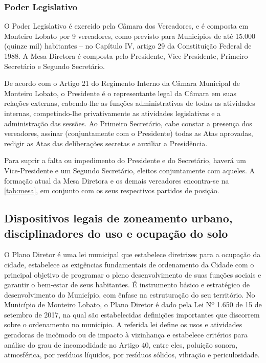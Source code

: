 

\subsubsection{Poder Legislativo}
O Poder Legislativo é exercido pela Câmara dos Vereadores, e é composta em Monteiro Lobato por 9 vereadores, como previsto para Municípios de até 15.000 (quinze mil) habitantes – no Capítulo IV, artigo 29 da Constituição Federal de 1988. A Mesa Diretora é composta pelo Presidente, Vice-Presidente, Primeiro Secretário e Segundo Secretário.

De acordo com o Artigo 21 do Regimento Interno da Câmara Municipal de Monteiro Lobato, o Presidente é o representante legal da Câmara em suas relações externas, cabendo-lhe as funções administrativas de todas as atividades internas, competindo-lhe privativamente as atividades legislativas e a administração das sessões. Ao Primeiro Secretário, cabe constar a presença dos vereadores, assinar (conjuntamente com o Presidente) todas as Atas aprovadas, redigir as Atas das deliberações secretas e auxiliar a Presidência.

Para suprir a falta ou impedimento do Presidente e do Secretário, haverá um Vice-Presidente e um Segundo Secretário, eleitos conjuntamente com aqueles. A formação atual da Mesa Diretora e os demais vereadores encontra-se na \autoref{tab:mesa}, em conjunto com os seus respectivos partidos de posição.



\subsection{Dispositivos legais de zoneamento urbano, disciplinadores do uso e ocupação do solo}
O Plano Diretor é uma lei municipal que estabelece diretrizes para a ocupação da cidade, estabelece as exigências fundamentais de ordenamento da Cidade com o principal objetivo de programar o pleno desenvolvimento de suas funções sociais e garantir o bem-estar de seus habitantes. É instrumento básico e estratégico de desenvolvimento do Município, com ênfase na estruturação do seu território.
No Município de Monteiro Lobato, o Plano Diretor é dado pela Lei Nº 1.650 de 15 de setembro de 2017, na qual são estabelecidas definições importantes que discorrem sobre o ordenamento no município. A referida lei define os usos e atividades geradoras de incômodo ou de impacto à vizinhança e estabelece critérios para análise do grau de incomodidade no Artigo 40, entre eles, poluição sonora, atmosférica, por resíduos líquidos, por resíduos sólidos, vibração e periculosidade.

